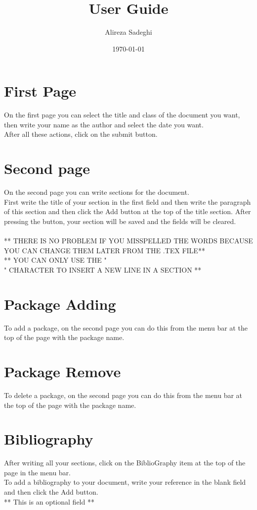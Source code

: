 \documentclass{article}
\title{User Guide}
\author{Alireza Sadeghi}
\affil{}
\date{\today}
\begin{document}
\maketitle{}
\section{First Page}
On the first page you can select the title and class of the document you want, then write 
your name as the author and select the date you want.\\
After all these actions, click on the submit button.
\section{Second page}
On the second page you can write sections for the document.\\
First write the title of your section in the first field and then write the paragraph of
this section and then click the Add button at the top of the title section. After pressing 
the button, your section will be saved and the fields will be cleared.\\\\
 ** THERE IS NO PROBLEM IF YOU MISSPELLED THE WORDS BECAUSE YOU CAN CHANGE THEM LATER FROM THE .TEX FILE**\\
            ** YOU CAN ONLY USE THE "\\" CHARACTER TO INSERT A NEW LINE IN A SECTION **\\
\section{Package Adding}
To add a package, on the second page you can do this from the menu bar at the top of the
page with the package name.
\section{Package Remove}
To delete a package, on the second page you can do this from the menu bar at the top of the
page with the package name.
\section{Bibliography}
After writing all your sections, click on the BiblioGraphy item at the top of the page in
the menu bar.\\
To add a bibliography to your document, write your reference in the blank field and then
click the Add button.\\
** This is an optional field **\\
\end{document}
